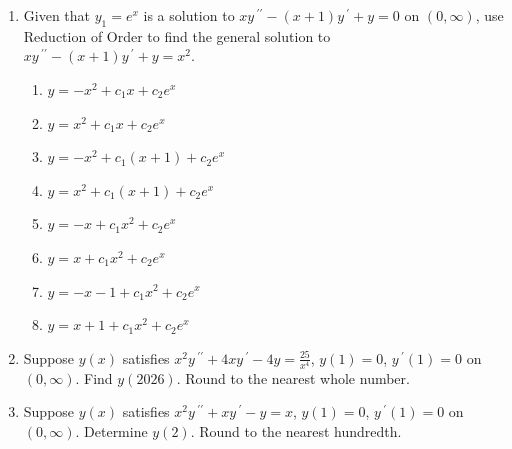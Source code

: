 \documentclass{ximera}
\begin{document}
\begin{enumerate}[label=(\arabic*)]




\item Given that $y_1=e^x$ is a solution to $xy\,^{\prime\prime}-(x+1)y\,^{\prime}+y=0$ on $(0,\infty)$, use Reduction of Order to find the general solution to\\ $xy\,^{\prime\prime}-(x+1)y\,^{\prime}+y=x^2$.


\begin{enumerate}[label=(\alph*)]
\item $y=-x^2+c_1x+c_2e^x$
\item $y=x^2+c_1x+c_2e^x$
\item $y=-x^2+c_1(x+1)+c_2e^x$ %
\item $y=x^2+c_1(x+1)+c_2e^x$
\item $y=-x+c_1x^2+c_2e^x$
\item $y=x+c_1x^2+c_2e^x$
\item $y=-x-1+c_1x^2+c_2e^x$
\item $y=x+1+c_1x^2+c_2e^x$
\end{enumerate}





\item Suppose $y(x)$ satisfies $x^2 y\,^{\prime\prime}+4xy\,^{\prime}-4y=\frac{25}{x^4}$, $y(1)=0$, $y\,^{\prime}(1)=0$ on $(0,\infty)$.  Find $y(2026)$.  Round to the nearest whole number.









\item Suppose $y(x)$ satisfies $x^2 y\,^{\prime\prime} +xy\,^{\prime}-y=x$, $y(1)=0$, $y\,^{\prime}(1)=0$ on $(0,\infty)$.  Determine $y(2)$.  Round to the nearest hundredth.



\end{enumerate}
\end{document}
